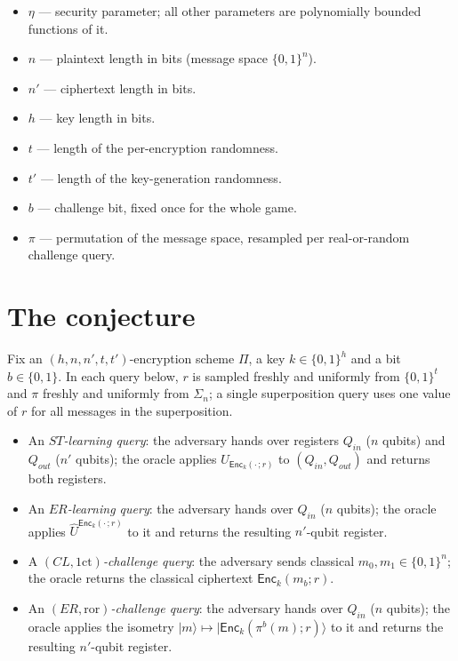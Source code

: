 \documentclass{aicr-conjecture}
\newcommand{\Enc}{\mathsf{Enc}}
\newcommand{\ror}{\mathrm{ror}}
\newcommand{\onect}{1\mathrm{ct}}
\newcommand{\ket}[1]{|#1\rangle}
\begin{document}
\begin{itemize}
  \item $\eta$ --- security parameter; all other parameters are
    polynomially bounded functions of it.
  \item $n$ --- plaintext length in bits (message space $\{0,1\}^n$).
  \item $n'$ --- ciphertext length in bits.
  \item $h$ --- key length in bits.
  \item $t$ --- length of the per-encryption randomness.
  \item $t'$ --- length of the key-generation randomness.
  \item $b$ --- challenge bit, fixed once for the whole game.
  \item $\pi$ --- permutation of the message space, resampled per
    real-or-random challenge query.
\end{itemize}

\section{The conjecture}\label{sec:conjectures}

\begin{definition}\label{def:queries}
Fix an $(h,n,n',t,t')$-encryption scheme $\Pi$, a key
$k\in\{0,1\}^{h}$ and a bit $b\in\{0,1\}$. In each query below, $r$ is
sampled freshly and uniformly from $\{0,1\}^{t}$ and $\pi$ freshly and
uniformly from $\Sigma_n$; a single superposition query uses one value
of $r$ for all messages in the superposition.
\begin{itemize}
  \item An \emph{$ST$-learning query}: the adversary hands over
    registers $Q_{in}$ ($n$ qubits) and $Q_{out}$ ($n'$ qubits); the
    oracle applies $U_{\Enc_k(\cdot\,;r)}$ to $(Q_{in},Q_{out})$ and
    returns both registers.
  \item An \emph{$ER$-learning query}: the adversary hands over
    $Q_{in}$ ($n$ qubits); the oracle applies
    $\hat U^{\Enc_k(\cdot\,;r)}$ to it and returns the resulting
    $n'$-qubit register.
  \item A \emph{$(CL,\onect)$-challenge query}: the adversary sends
    classical $m_0,m_1\in\{0,1\}^{n}$; the oracle returns the classical
    ciphertext $\Enc_k(m_b;r)$.
  \item An \emph{$(ER,\ror)$-challenge query}: the adversary hands over
    $Q_{in}$ ($n$ qubits); the oracle applies the isometry
    $\ket{m}\mapsto\ket{\Enc_k(\pi^{b}(m);r)}$ to it and returns the
    resulting $n'$-qubit register.
\end{itemize}
\end{definition}
\end{document}
